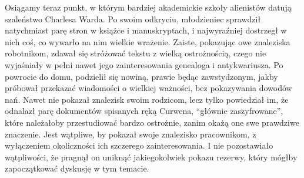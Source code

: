 Osiągamy teraz punkt, w którym bardziej akademickie szkoły alienistów datują szaleństwo Charlesa Warda. Po swoim odkryciu, młodzieniec sprawdził natychmiast parę stron w książce i manuskryptach, i najwyraźniej dostrzegł w nich coś, co wywarło na nim wielkie wrażenie. Zaiste, pokazując owe znaleziska robotnikom, zdawał się stróżować tekstu z wielką ostrożnością, czego nie wyjaśniały w pełni nawet jego zainteresowania genealoga i antykwariusza. Po powrocie do domu, podzielił się nowiną, prawie będąc zawstydzonym, jakby próbował przekazać wiadomości o wielkiej ważności, bez pokazywania dowodów nań. Nawet nie pokazał znalezisk swoim rodzicom, lecz tylko powiedział im, że odnalazł parę dokumentów spisanych ręką Curwena, ``głównie zaszyfrowane'', które należałoby przestudiować bardzo ostrożnie, zanim okażą one swe prawdziwe znaczenie. Jest wątpliwe, by pokazał swoje znalezisko pracownikom, z wyłączeniem okoliczności ich szczerego zainteresowania. I nie pozostawiało wątpliwości, że pragnął on uniknąć jakiegokolwiek pokazu rezerwy, który mógłby zapoczątkować dyskusję w tym temacie. 

